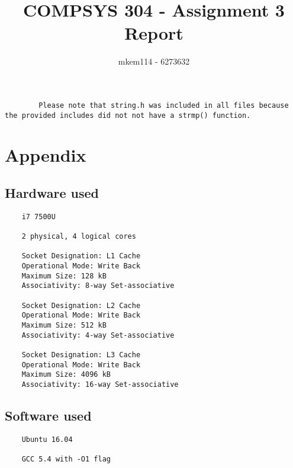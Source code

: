 \documentclass[10pt,a4paper,oneside]{article}
\author{mkem114 - 6273632}
\title{COMPSYS 304 - Assignment 3 Report}
\begin{document}
    \maketitle

    \begin{verbatim}
        Please note that string.h was included in all files because the provided includes did not not have a strmp() function.
    \end{verbatim}

    \section*{Appendix}
        \subsection*{Hardware used}
            \begin{verbatim}
    i7 7500U

    2 physical, 4 logical cores

    Socket Designation: L1 Cache
    Operational Mode: Write Back
    Maximum Size: 128 kB
    Associativity: 8-way Set-associative

    Socket Designation: L2 Cache
    Operational Mode: Write Back
    Maximum Size: 512 kB
    Associativity: 4-way Set-associative

    Socket Designation: L3 Cache
    Operational Mode: Write Back
    Maximum Size: 4096 kB
    Associativity: 16-way Set-associative
            \end{verbatim}
        \subsection*{Software used}
            \begin{verbatim}
    Ubuntu 16.04

    GCC 5.4 with -O1 flag
            \end{verbatim}
\end{document}
